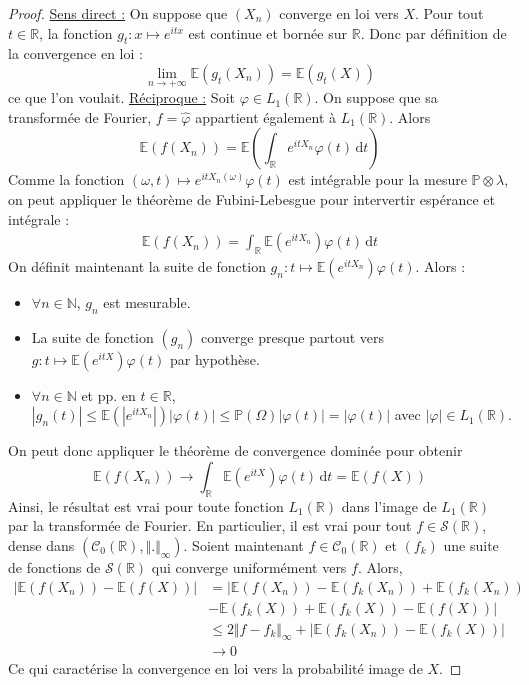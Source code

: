   \begin{proof}
    \uline{Sens direct :} On suppose que $(X_n)$ converge en loi vers $X$. Pour tout $t \in \mathbb{R}$, la fonction $g_t : x \mapsto e^{itx}$ est continue et bornée sur $\mathbb{R}$. Donc par définition de la convergence en loi :
    \[ \lim_{n \rightarrow +\infty} \mathbb{E}(g_t(X_n)) = \mathbb{E}(g_t(X)) \]
    ce que l'on voulait.
    \newpar
    \uline{Réciproque :} Soit $\varphi \in L_1(\mathbb{R})$. On suppose que sa transformée de Fourier, $f = \widehat{\varphi}$ appartient également à $L_1(\mathbb{R})$. Alors
    \[ \mathbb{E}(f(X_n)) = \mathbb{E} \left ( \int_{\mathbb{R}} e^{itX_n} \varphi(t) \, \mathrm{d}t \right ) \]
    Comme la fonction $(\omega, t) \mapsto e^{itX_n(\omega)} \varphi(t)$ est intégrable pour la mesure $\mathbb{P} \otimes \lambda$, on peut appliquer le théorème de Fubini-Lebesgue pour intervertir espérance et intégrale :
    \begin{align*}
      \mathbb{E}(f(X_n)) = \int_{\mathbb{R}} \mathbb{E} (e^{itX_n}) \varphi(t) \, \mathrm{d}t
    \end{align*}
    On définit maintenant la suite de fonction $g_n : t \mapsto \mathbb{E} (e^{itX_n}) \varphi(t)$. Alors :
    \begin{itemize}
      \item $\forall n \in \mathbb{N}$, $g_n$ est mesurable.
      \item La suite de fonction $(g_n)$ converge presque partout vers $g : t \mapsto \mathbb{E} (e^{itX}) \varphi(t)$ par hypothèse.
      \item $\forall n \in \mathbb{N}$ et pp. en $t \in \mathbb{R}$, $|g_n(t)| \leq \mathbb{E} (|e^{itX_n}|) |\varphi(t)| \leq \mathbb{P}(\Omega) |\varphi(t)| = |\varphi(t)|$ avec $|\varphi| \in L_1(\mathbb{R})$.
    \end{itemize}
    On peut donc appliquer le théorème de convergence dominée pour obtenir
    \[ \mathbb{E}(f(X_n)) \longrightarrow \int_{\mathbb{R}} \mathbb{E} (e^{itX}) \varphi(t) \, \mathrm{d}t = \mathbb{E}(f(X)) \]
    Ainsi, le résultat est vrai pour toute fonction $L_1(\mathbb{R})$ dans l'image de $L_1(\mathbb{R})$ par la transformée de Fourier. En particulier, il est vrai pour tout $f \in \mathcal{S}(\mathbb{R})$, dense dans $(\mathcal{C}_0(\mathbb{R}), \Vert . \Vert_\infty)$. Soient maintenant $f \in \mathcal{C}_0(\mathbb{R})$ et $(f_k)$ une suite de fonctions de $\mathcal{S}(\mathbb{R})$ qui converge uniformément vers $f$. Alors,
    \begin{align*}
      |\mathbb{E}(f(X_n)) - \mathbb{E}(f(X))| &= |\mathbb{E}(f(X_n)) - \mathbb{E}(f_k(X_n)) + \mathbb{E}(f_k(X_n)) \\
      &- \mathbb{E}(f_k(X)) + \mathbb{E}(f_k(X)) - \mathbb{E}(f(X))| \\
      &\leq 2 \Vert f - f_k \Vert_\infty + |\mathbb{E}(f_k(X_n)) - \mathbb{E}(f_k(X))| \\
      &\longrightarrow 0
    \end{align*}
    Ce qui caractérise la convergence en loi vers la probabilité image de $X$.
  \end{proof}

